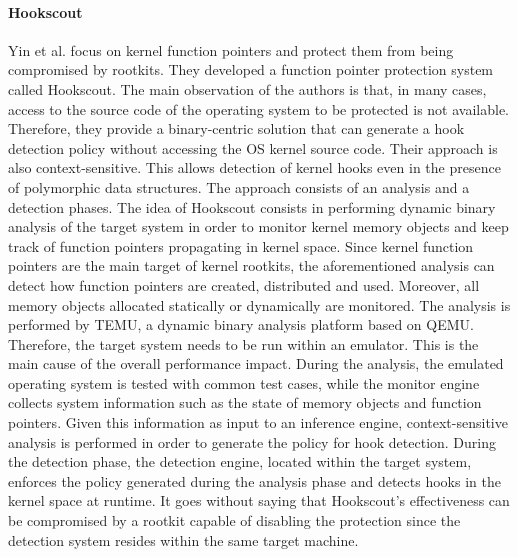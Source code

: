 \paragraph{Hookscout}
Yin et al. \cite{hookscout} focus on kernel function pointers and protect them from being compromised by rootkits. 
They developed a function pointer protection system called Hookscout. 
The main observation of the authors is that, in many cases, access to the source code of the operating system to be protected is not available. Therefore, they provide a binary-centric solution that can generate a hook detection policy without accessing  the OS kernel source code. 
Their approach is also context-sensitive. This allows detection of kernel hooks even in the presence of polymorphic data structures.
The approach consists of an analysis and a detection phases.
The idea of Hookscout consists in performing dynamic binary analysis of the target system in order to monitor kernel memory objects and keep track of function pointers propagating in kernel space. Since kernel function pointers are the main target of kernel rootkits, the aforementioned analysis can detect how function pointers are created, distributed and used. Moreover, all memory objects allocated statically or dynamically are monitored.
The analysis is performed by TEMU, a dynamic binary analysis platform based on QEMU. Therefore, the target system needs to be run within an emulator. This is the main cause of the overall performance impact.
During the analysis, the emulated operating system is tested with common test cases, while the monitor engine collects system information such as the state of memory objects and function pointers. Given this information as input to an inference engine, context-sensitive analysis is performed in order to generate the policy for hook detection.
During the detection phase, the detection engine, located within the target system, enforces the policy generated
during the analysis phase and detects hooks in the kernel space at runtime.
It goes without saying that Hookscout's effectiveness can be compromised by a rootkit capable of disabling the protection since the detection system resides within the same target machine.

